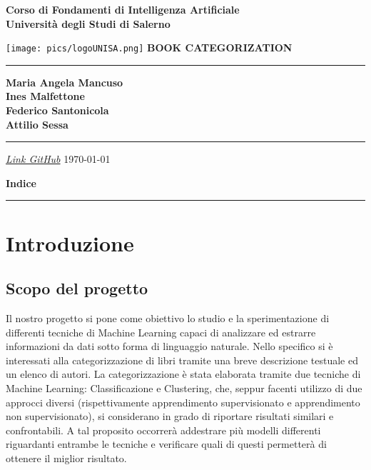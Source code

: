 \documentclass[12pt,oneside]{article}
\begin{document}
\begin{titlepage}
    \begin{flushright}
        \textbf{Corso di Fondamenti di Intelligenza Artificiale}
        \textbf{\\Università degli Studi di Salerno}
    \end{flushright}
    \vspace*{1.5cm}
    \centering
    \texttt{[image: pics/logoUNISA.png]}
    \vfill
    \Huge\textbf{BOOK CATEGORIZATION}
    \vspace{1ex}
    \rule{\linewidth}{1pt}
    \Large\textbf{Maria Angela Mancuso \\
        Ines Malfettone \\
        Federico Santonicola \\
        Attilio Sessa\\
        }
    \rule{\linewidth}{1pt}
    \vspace{2cm}
    \hfill
    \textit{\href{https://github.com/fedesanto/ProgettoFIA}{Link GitHub}}
    \hfill
    \vfill
    \today
\end{titlepage}

\clearpage %

\setcounter{page}{1}

\begin{flushright}
        \Large\textbf{Indice}
\end{flushright}
\rule{\linewidth}{1pt}

\renewcommand{\contentsname}{}
\tableofcontents

\clearpage
\setcounter{section}{0}
\section{Introduzione}
    \begin{enumerate}
    \subsection{Scopo del progetto}
    \begin{justify}

        Il nostro progetto si pone come obiettivo lo studio e la sperimentazione di differenti tecniche di Machine Learning capaci di analizzare ed estrarre informazioni da dati sotto forma di linguaggio naturale. Nello specifico si è interessati alla categorizzazione di libri tramite una breve descrizione testuale ed un elenco di autori. La categorizzazione è stata elaborata tramite due tecniche di Machine Learning: Classificazione e Clustering, che, seppur facenti utilizzo di due approcci diversi (rispettivamente apprendimento supervisionato e apprendimento non supervisionato), si considerano in grado di riportare risultati similari e confrontabili. A tal proposito occorrerà addestrare più modelli differenti riguardanti entrambe le tecniche e verificare quali di questi permetterà di ottenere il miglior risultato.

    \end{justify}
    \end{enumerate}
\end{document}
